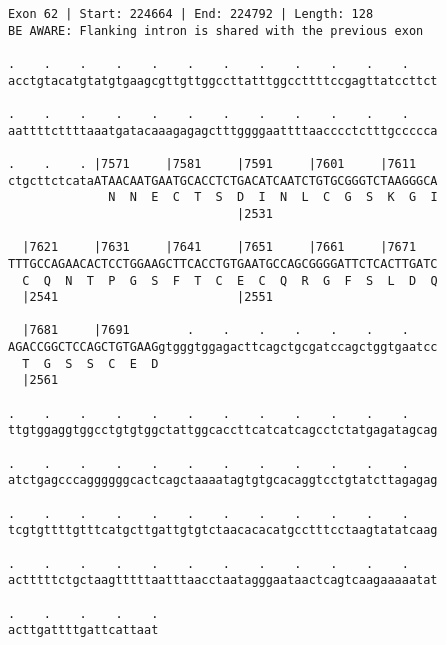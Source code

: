 \documentclass{article}
\begin{document}
\begin{Verbatim}
Exon 62 | Start: 224664 | End: 224792 | Length: 128
BE AWARE: Flanking intron is shared with the previous exon
 
.    .    .    .    .    .    .    .    .    .    .    .    
acctgtacatgtatgtgaagcgttgttggccttatttggccttttccgagttatccttct
  
.    .    .    .    .    .    .    .    .    .    .    .    
aattttcttttaaatgatacaaagagagctttggggaattttaacccctctttgccccca
  
.    .    . |7571     |7581     |7591     |7601     |7611   
ctgcttctcataATAACAATGAATGCACCTCTGACATCAATCTGTGCGGGTCTAAGGGCA
              N  N  E  C  T  S  D  I  N  L  C  G  S  K  G  I
                                |2531                       
  
  |7621     |7631     |7641     |7651     |7661     |7671   
TTTGCCAGAACACTCCTGGAAGCTTCACCTGTGAATGCCAGCGGGGATTCTCACTTGATC
  C  Q  N  T  P  G  S  F  T  C  E  C  Q  R  G  F  S  L  D  Q
  |2541                         |2551                       
  
  |7681     |7691        .    .    .    .    .    .    .    
AGACCGGCTCCAGCTGTGAAGgtgggtggagacttcagctgcgatccagctggtgaatcc
  T  G  S  S  C  E  D                                       
  |2561                                                     
  
.    .    .    .    .    .    .    .    .    .    .    .    
ttgtggaggtggcctgtgtggctattggcaccttcatcatcagcctctatgagatagcag
  
.    .    .    .    .    .    .    .    .    .    .    .    
atctgagcccaggggggcactcagctaaaatagtgtgcacaggtcctgtatcttagagag
  
.    .    .    .    .    .    .    .    .    .    .    .    
tcgtgttttgtttcatgcttgattgtgtctaacacacatgcctttcctaagtatatcaag
  
.    .    .    .    .    .    .    .    .    .    .    .    
actttttctgctaagtttttaatttaacctaatagggaataactcagtcaagaaaaatat
  
.    .    .    .    .
acttgattttgattcattaat
\end{Verbatim}
\newpage
\end{document}
